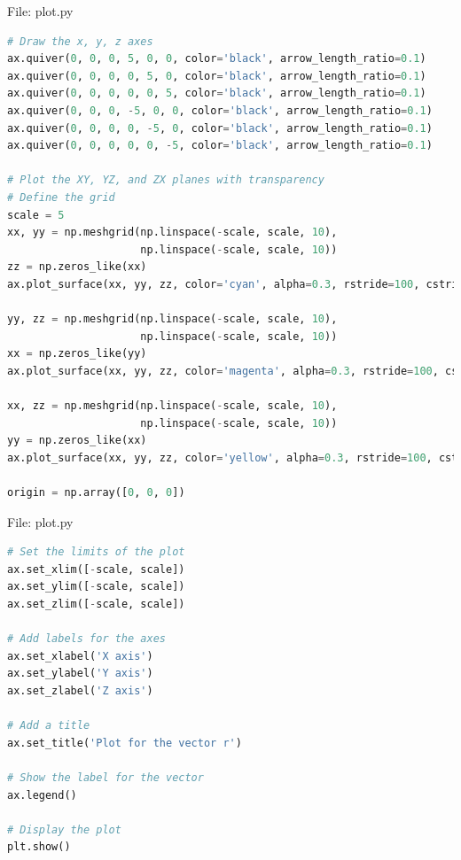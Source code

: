\documentclass{beamer}
\numberwithin{equation}{section}
\theoremstyle{remark}
\begin{document}
\begin{frame}[fragile]{File: plot.py}
\begin{lstlisting}[language=Python]
# Draw the x, y, z axes
ax.quiver(0, 0, 0, 5, 0, 0, color='black', arrow_length_ratio=0.1)
ax.quiver(0, 0, 0, 0, 5, 0, color='black', arrow_length_ratio=0.1)
ax.quiver(0, 0, 0, 0, 0, 5, color='black', arrow_length_ratio=0.1)
ax.quiver(0, 0, 0, -5, 0, 0, color='black', arrow_length_ratio=0.1)
ax.quiver(0, 0, 0, 0, -5, 0, color='black', arrow_length_ratio=0.1)
ax.quiver(0, 0, 0, 0, 0, -5, color='black', arrow_length_ratio=0.1)

# Plot the XY, YZ, and ZX planes with transparency
# Define the grid
scale = 5
xx, yy = np.meshgrid(np.linspace(-scale, scale, 10),
                     np.linspace(-scale, scale, 10))
zz = np.zeros_like(xx)
ax.plot_surface(xx, yy, zz, color='cyan', alpha=0.3, rstride=100, cstride=100)

yy, zz = np.meshgrid(np.linspace(-scale, scale, 10),
                     np.linspace(-scale, scale, 10))
xx = np.zeros_like(yy)
ax.plot_surface(xx, yy, zz, color='magenta', alpha=0.3, rstride=100, cstride=100)

xx, zz = np.meshgrid(np.linspace(-scale, scale, 10),
                     np.linspace(-scale, scale, 10))
yy = np.zeros_like(xx)
ax.plot_surface(xx, yy, zz, color='yellow', alpha=0.3, rstride=100, cstride=100)

origin = np.array([0, 0, 0])
\end{lstlisting}
\end{frame}

\begin{frame}[fragile]{File: plot.py}
\begin{lstlisting}[language=Python]
# Set the limits of the plot
ax.set_xlim([-scale, scale])
ax.set_ylim([-scale, scale])
ax.set_zlim([-scale, scale])

# Add labels for the axes
ax.set_xlabel('X axis')
ax.set_ylabel('Y axis')
ax.set_zlabel('Z axis')

# Add a title
ax.set_title('Plot for the vector r')

# Show the label for the vector
ax.legend()

# Display the plot
plt.show()
\end{lstlisting}
\end{frame}
\end{document}
